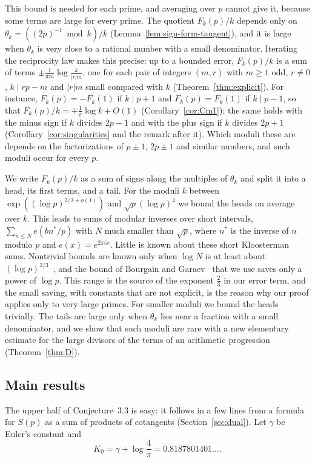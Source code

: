 This bound is needed for each prime, and averaging over $p$ cannot give it, because some terms are large for every prime. The quotient $F_k(p)/k$ depends only on $\theta_k=((2p)^{-1}\bmod k)/k$ (Lemma~\ref{lem:sign-form-tangent}), and it is large when $\theta_k$ is very close to a rational number with a small denominator. Iterating the reciprocity law makes this precise: up to a bounded error, $F_k(p)/k$ is a sum of terms $\pm\frac1{\pi m}\log\frac k{|r|m}$, one for each pair of integers $(m,r)$ with $m\ge1$ odd, $r\ne0$, $k\mid rp-m$ and $|r|m$ small compared with $k$ (Theorem~\ref{thm:explicit}). For instance, $F_k(p)=-F_k(1)$ if $k\mid p+1$ and $F_k(p)=F_k(1)$ if $k\mid p-1$, so that $F_k(p)/k=\mp\frac1\pi\log k+O(1)$ (Corollary~\ref{cor:Cm1}); the same holds with the minus sign if $k$ divides $2p-1$ and with the plus sign if $k$ divides $2p+1$ (Corollary~\ref{cor:singularities} and the remark after it). Which moduli these are depends on the factorizations of $p\pm1$, $2p\pm1$ and similar numbers, and such moduli occur for every $p$.

We write $F_k(p)/k$ as a sum of signs along the multiples of $\theta_k$ and split it into a head, its first terms, and a tail. For the moduli $k$ between $\exp((\log p)^{2/3+o(1)})$ and $\sqrt p(\log p)^4$ we bound the heads on average over $k$. This leads to sums of modular inverses over short intervals, $\sum_{n\le N}e(bn^*/p)$ with $N$ much smaller than $\sqrt p$, where $n^*$ is the inverse of $n$ modulo $p$ and $e(x)=e^{2\pi ix}$. Little is known about these short Kloosterman sums. Nontrivial bounds are known only when $\log N$ is at least about $(\log p)^{2/3}$~\cite[Section~1.1]{b12}, and the bound of Bourgain and Garaev~\cite{b8} that we use saves only a power of $\log p$. This range is the source of the exponent $\frac23$ in our error term, and the small saving, with constants that are not explicit, is the reason why our proof applies only to very large primes. For smaller moduli we bound the heads trivially. The tails are large only when $\theta_k$ lies near a fraction with a small denominator, and we show that such moduli are rare with a new elementary estimate for the large divisors of the terms of an arithmetic progression (Theorem~\ref{thm:D}).

\subsection{Main results}\label{subsec:main}
The upper half of Conjecture~3.3 is easy: it follows in a few lines from a formula for $S(p)$ as a sum of products of cotangents (Section~\ref{sec:dual}). Let $\gamma$ be Euler's constant and
\begin{equation}\label{eq:K0}
K_0=\gamma+\log\frac4\pi=0.8187801401\ldots.
\end{equation}

